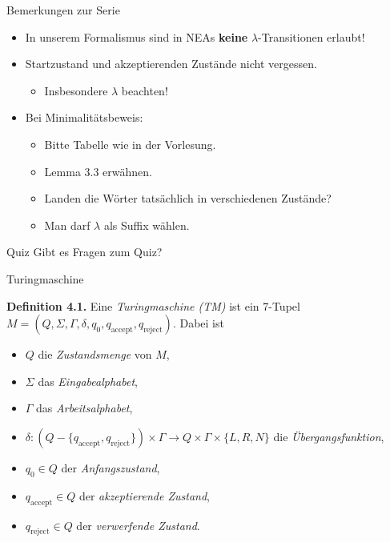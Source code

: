 \documentclass[11pt,aspectratio=169]{beamer}
\begin{document}
\begin{frame}{Bemerkungen zur Serie}
    \begin{itemize}
    \item
        In unserem Formalismus sind in NEAs \textbf{keine}
        \(\lambda\)-Transitionen erlaubt!
        \vspace{1em}
    \item
        Startzustand und akzeptierenden Zustände nicht vergessen.
        \begin{itemize}
            \item Insbesondere \(\lambda\) beachten!
        \end{itemize}
        \vspace{1em}
    \item
        Bei Minimalitätsbeweis:
        \begin{itemize}
            \item Bitte Tabelle wie in der Vorlesung.
            \item Lemma 3.3 erwähnen.
            \item Landen die Wörter tatsächlich in verschiedenen Zustände?
            \item Man darf \(\lambda\) als Suffix wählen.
        \end{itemize}
    \end{itemize}
\end{frame}

\begin{frame}{Quiz}
    Gibt es Fragen zum Quiz?
\end{frame}

\begin{frame}{Turingmaschine}

\textbf{Definition 4.1.}
Eine \textit{Turingmaschine (TM)} ist ein 7-Tupel
\(M = (Q, \Sigma, \Gamma, \delta, q_0, q_{\text{accept}}, q_{\text{reject}})\).
Dabei ist

\begin{itemize}
    \item \(Q\) die \textit{Zustandsmenge} von \(M\),
    \item \(\Sigma\) das \textit{Eingabealphabet},
    \item \(\Gamma\) das \textit{Arbeitsalphabet},
    \item \(\delta : (Q - \{q_{\text{accept}}, q_{\text{reject}}\}) \times \Gamma
        \to Q \times \Gamma \times \{L, R, N\}\) die \textit{Übergangsfunktion},
    \item \(q_0 \in Q\) der \textit{Anfangszustand},
    \item \(q_{\text{accept}} \in Q\) der \textit{akzeptierende Zustand},
    \item \(q_{\text{reject}} \in Q\) der \textit{verwerfende Zustand}.
\end{itemize}

\end{frame}
\end{document}
